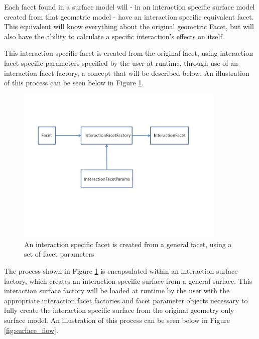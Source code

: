 Each facet found in a surface model will - in an interaction specific
surface model created from that geometric model - have an interaction
specific equivalent facet. This equivalent will know everything about
the original geometric Facet, but will also have the ability to
calculate a specific interaction's effects on itself. 

This interaction specific facet is created from the original facet,
using interaction facet specific parameters specified by the
user at runtime, through use of an interaction facet factory,
a concept that will be described below.
An illustration of this process can be seen below in Figure
\ref{fig:facet_flow}.

\begin{figure}[H]
\begin{center}
\includegraphics[height=75mm]{figs/facet_flow.jpg}
\caption{An interaction specific facet is created from a general facet,
using a set of facet parameters}
\label{fig:facet_flow}
\end{center}
\end{figure}

The process shown in Figure \ref{fig:facet_flow} is encapsulated within
an interaction surface factory, which creates an interaction
specific surface from a general surface. This interaction surface factory
will be loaded  at runtime by the user with the 
appropriate interaction facet factories and facet parameter objects
necessary to fully create the interaction specific surface
from the original geometry only surface model. An illustration of
this process can be seen below in Figure \ref{fig:surface_flow}.

